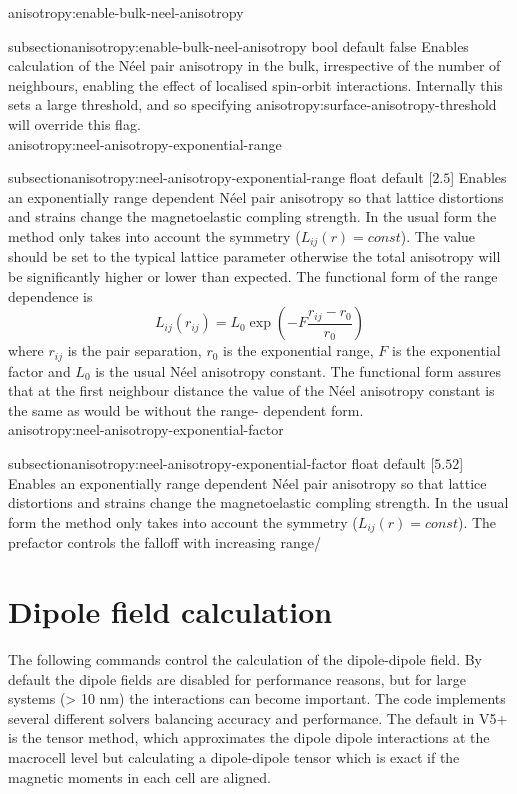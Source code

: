 {\zicf anisotropy:enable-bulk-neel-anisotropy}
{subsection}{anisotropy:enable-bulk-neel-anisotropy}
  bool default false
  Enables calculation of the N\'eel pair anisotropy in the bulk, irrespective of
  the number of neighbours, enabling the effect of localised spin-orbit
  interactions. Internally this sets a large threshold, and so specifying
  anisotropy:surface-anisotropy-threshold will override this flag.\\

{\zicf anisotropy:neel-anisotropy-exponential-range}
{subsection}{anisotropy:neel-anisotropy-exponential-range}
  float default [$2.5$]
  Enables an exponentially range dependent N\'eel pair anisotropy so that
  lattice distortions and strains change the magnetoelastic compling strength.
  In the usual form the method only takes into account the symmetry ($L_{ij}(r)
  = const$). The value should be set to the typical lattice parameter otherwise
  the total anisotropy will be significantly higher or lower than expected. The
  functional form of the range dependence is
  \begin{equation}
     L_{ij}(r_{ij}) = L_0 \exp\left(-F\frac{r_{ij} - r_0}{r_{0}}\right)
  \end{equation}
  where $r_{ij}$ is the pair separation, $r_0$ is the exponential range,
  $F$ is the exponential factor and $L_0$ is the usual N\'eel anisotropy constant.
  The functional form assures that at the first neighbour distance the value of
  the N\'eel anisotropy constant is the same as would be without the range-
  dependent form.\\

{\zicf anisotropy:neel-anisotropy-exponential-factor}
{subsection}{anisotropy:neel-anisotropy-exponential-factor}
   float default [$5.52$]
   Enables an exponentially range dependent N\'eel pair anisotropy so that
   lattice distortions and strains change the magnetoelastic compling strength.
   In the usual form the method only takes into account the symmetry ($L_{ij}(r)
   = const$). The prefactor controls the falloff with increasing range/\\

\section*{Dipole field calculation}
The following commands control the calculation of the dipole-dipole field. By
default the dipole fields are disabled for performance reasons, but for large
systems (> 10 nm) the interactions can become important. The \vampire code
implements several different solvers balancing accuracy and performance. The
default in V5+ is the tensor method, which approximates the dipole dipole
interactions at the macrocell level but calculating a dipole-dipole tensor which
is exact if the magnetic moments in each cell are aligned.\\

